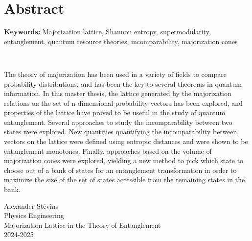 \chapter*{Abstract}


\textbf{Keywords:} Majorization lattice, Shannon entropy, supermodularity, entanglement, quantum resource theories, incomparability, majorization cones

~

The theory of majorization has been used in a variety of fields to compare probability distributions, and has been the key to several theorems in quantum information. In this master thesis, the lattice generated by the majorization relations on the set of n-dimensional probability vectors has been explored, and properties of the lattice have proved to be useful in the study of quantum entanglement. Several approaches to study the incomparability between two states were explored. New quantities quantifying the incomparability between vectors on the lattice were defined using entropic distances and were shown to be entanglement monotones. Finally, approaches based on the volume of majorization cones were explored, yielding a new method to pick which state to choose out of a bank of states for an entanglement transformation in order to maximize the size of the set of states accessible from the remaining states in the bank.

\vspace*{\fill}
\noindent Alexander Stévins\\
Physics Engineering\\
Majorization Lattice in the Theory of Entanglement\\
2024-2025
